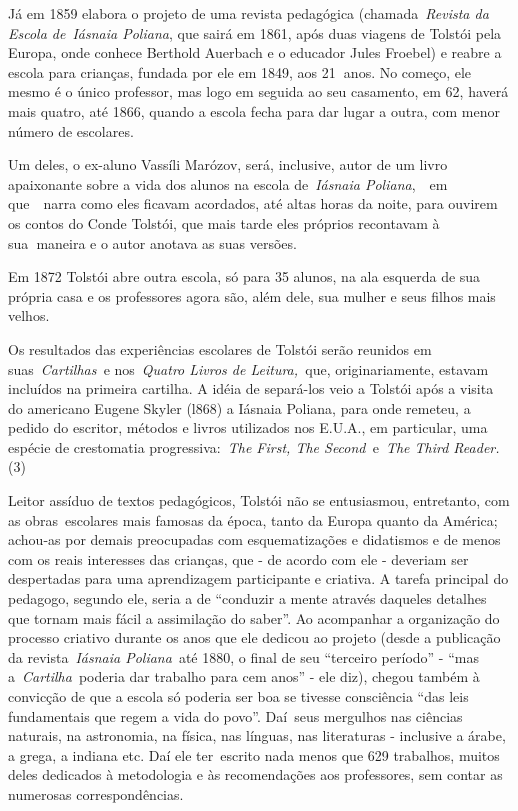 Já em 1859 elabora o projeto de uma revista pedagógica
(chamada~\emph{Revista da Escola de}~\emph{Iásnaia Poliana}, que sairá
em 1861, após duas viagens de Tolstói pela Europa, onde conhece Berthold
Auerbach e o educador Jules Froebel) e reabre a escola para crianças,
fundada por ele em 1849, aos 21\textbf{~}anos. No começo, ele mesmo é o
único professor, mas logo em seguida ao seu casamento, em 62, haverá
mais quatro, até 1866, quando a escola fecha para dar lugar a outra, com
menor número de escolares.

Um deles, o ex-aluno Vassíli Marózov, será, inclusive, autor de um livro
apaixonante sobre a vida dos alunos na escola de~\emph{Iásnaia
Poliana},~~em que~~narra como eles ficavam acordados, até altas horas da
noite, para ouvirem os contos do Conde Tolstói, que mais tarde eles
próprios recontavam à sua\textbf{~}maneira e o autor anotava as suas
versões.

Em 1872 Tolstói abre outra escola, só para 35 alunos, na ala esquerda de
sua própria casa e os professores agora são, além dele, sua mulher e
seus filhos mais velhos.

Os resultados das experiências escolares de Tolstói serão reunidos em
suas~\emph{Cartilhas~}e nos~\emph{Quatro Livros de Leitura,~}que,
originariamente, estavam incluídos na primeira cartilha. A idéia de
separá-los veio a Tolstói após a visita do americano Eugene Skyler
(l868) a Iásnaia Poliana, para onde remeteu, a pedido do escritor,
métodos e livros utilizados nos E.U.A., em particular, uma espécie de
crestomatia progressiva:~\emph{The First, The Second~}e~\emph{The Third
Reader.}(3)

Leitor assíduo de textos pedagógicos, Tolstói não se entusiasmou,
entretanto, com as obras~escolares mais famosas da época, tanto da
Europa quanto da América; achou-as por demais preocupadas com
esquematizações e didatismos e de menos com os reais interesses das
crianças, que - de acordo com ele - deveriam ser despertadas para uma
aprendizagem participante e criativa. A tarefa principal do pedagogo,
segundo ele, seria a de ``conduzir a mente através daqueles detalhes que
tornam mais fácil a assimilação do saber''. Ao acompanhar a organização
do processo criativo durante os anos que ele dedicou ao projeto (desde a
publicação da revista~\emph{Iásnaia Poliana}~até 1880, o final de seu
``terceiro período'' - ``mas a~\emph{Cartilha}~poderia dar trabalho para
cem anos'' - ele diz), chegou também à convicção de que a escola só
poderia ser boa se tivesse consciência ``das leis fundamentais que regem
a vida do povo''. Daí~seus mergulhos nas ciências naturais, na
astronomia, na física, nas línguas, nas literaturas - inclusive a árabe,
a grega, a indiana etc. Daí ele ter~escrito nada menos que 629
trabalhos, muitos deles dedicados à metodologia e às recomendações aos
professores, sem contar as numerosas correspondências.~~

